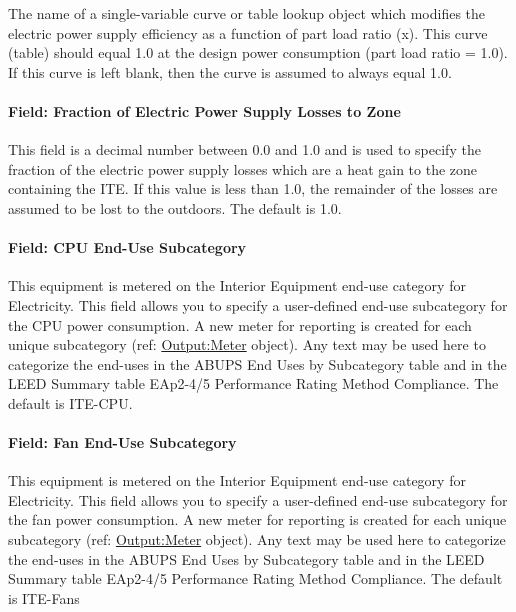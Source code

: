 The name of a single-variable curve or table lookup object which modifies the electric power supply efficiency as a function of part load ratio (x). This curve (table) should equal 1.0 at the design power consumption (part load ratio = 1.0). If this curve is left blank, then the curve is assumed to always equal 1.0.

\paragraph{Field: Fraction of Electric Power Supply Losses to Zone}\label{field-fraction-of-electric-power-supply-losses-to-zone}

This field is a decimal number between 0.0 and 1.0 and is used to specify the fraction of the electric power supply losses which are a heat gain to the zone containing the ITE. If this value is less than 1.0, the remainder of the losses are assumed to be lost to the outdoors. The default is 1.0.

\paragraph{Field: CPU End-Use Subcategory}\label{field-cpu-end-use-subcategory}

This equipment is metered on the Interior Equipment end-use category for Electricity. This field allows you to specify a user-defined end-use subcategory for the CPU power consumption. A new meter for reporting is created for each unique subcategory (ref: \hyperref[outputmeter-and-outputmetermeterfileonly]{Output:Meter} object). Any text may be used here to categorize the end-uses in the ABUPS End Uses by Subcategory table and in the LEED Summary table EAp2-4/5 Performance Rating Method Compliance. The default is ITE-CPU.

\paragraph{Field: Fan End-Use Subcategory}\label{field-fan-end-use-subcategory}

This equipment is metered on the Interior Equipment end-use category for Electricity. This field allows you to specify a user-defined end-use subcategory for the fan power consumption. A new meter for reporting is created for each unique subcategory (ref: \hyperref[outputmeter-and-outputmetermeterfileonly]{Output:Meter} object). Any text may be used here to categorize the end-uses in the ABUPS End Uses by Subcategory table and in the LEED Summary table EAp2-4/5 Performance Rating Method Compliance. The default is ITE-Fans

